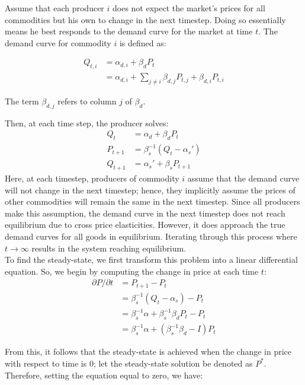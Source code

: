 \documentclass[12pt]{article}
\begin{document}
Assume that each producer $i$ does not expect the market's prices for all commodities but his own to change in the next timestep. Doing so essentially means he best responds to the demand curve for the market at time $t$. The demand curve for commodity $i$ is defined as:

\begin{align*}
Q_{t,i} &= \alpha_{d,i} + \beta_d P_t \\
&= \alpha_{d,i} + \sum_{j \neq i} \beta_{d,j} P_{t,j} + \beta_{d,i} P_{t,i}
\end{align*}

The term $\beta_{d,j}$ refers to column $j$ of $\beta_d$.

 Then, at each time step, the producer solves:
\begin{align*}
Q_{t} &= \alpha_d + \beta_d P_t \\
P_{t+1}& = \beta_s^{-1} (Q_{t} - \alpha_s') \\
Q_{t+1} &= \alpha_s' + \beta_s P_{t+1}
\end{align*}
Here, at each timestep, producers of commodity $i$ assume that the demand curve will not change in the next timestep; hence, they implicitly assume the prices of other commodities will remain the same in the next timestep. Since all producers make this assumption, the demand curve in the next timestep does not reach equilibrium due to cross price elasticities. However, it does approach the true demand curves for all goods in equilibrium. Iterating through this process where $t \to \infty$ results in the system reaching equilibrium.   \\

To find the steady-state, we first transform this problem into a linear differential equation. So, we begin by computing the change in price at each time $t$:
\begin{align*}
{\partial P}/{\partial t} &= P_{t+1} - P_t 		     \\
&= \beta_s^{-1} (Q_{t} - \alpha_s) - P_t				 \\
&= \beta_s^{-1} \alpha  + \beta_s^{-1} \beta_d P_t - P_t \\
&= \beta_s^{-1} \alpha  + (\beta_s^{-1} \beta_d - I) P_t
\end{align*}

From this, it follows that the steady-state is achieved when the change in price with respect to time is 0; let the steady-state solution be denoted as $P^*$. Therefore, setting the equation equal to zero, we have:
\end{document}
